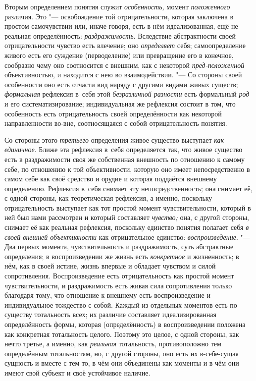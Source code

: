 Вторым определением понятия служит
{\em особенность,} момент
{\em положенного}
различия. Это "--- освобождение той
отрицательности, которая заключена в простом самочувствии или, иначе
говоря, есть в нём идеализованная, ещё не реальная определённость:
{\em раздражимость}.
Вследствие абстрактности своей отрицательности чувство есть
влечение; оно {\em определяет}
себя; самоопределение живого есть его суждение (перводеление)
или превращение его в конечное, сообразно чему оно соотносится с внешним,
как с некоторой {\em пред-положенной}
объективностью, и находится с нею во взаимодействии. "---
Со стороны своей особенности оно есть отчасти вид наряду с
другими видами живых существ;
{\em формальная}
рефлексия в~себя этой
{\em безразличной разности}
есть формальный {\em род}
и его систематизирование; индивидуальная же рефлексия состоит
в том, что особенность есть отрицательность своей определённости как
некоторой направленности во-вне, соотносящаяся с собой отрицательность
понятия.

Со стороны этого
{\em третьего}
определения живое существо выступает
{\em как единичное}.
Ближе эта рефлексия в~себя определяется так, что живое
существо есть в раздражимости своя же собственная внешность по отношению к
самому себе, по отношению к той объективности, которую оно имеет
непосредственно в самом себе как своё средство и орудие и которая поддаётся
внешнему определению. Рефлексия в~себя снимает эту непосредственность; она
снимает её, с одной стороны, как теоретическая рефлексия, а именно,
поскольку отрицательность выступает как тот простой момент
чувствительности, который в ней был нами рассмотрен и который составляет
{\em чувство;} она, с
другой стороны, снимает её как реальная рефлексия, поскольку единство
понятия полагает себя {\em в своей
внешней объективности} как отрицательное единство:
{\em воспроизведение}. "---
Два первых момента, чувствительность и раздражимость, суть
абстрактные определения; в воспроизведении же жизнь есть
{\em конкретное} и
жизненность; в нём, как в своей истине, жизнь впервые и обладает чувством и
силой сопротивления. Воспроизведение есть отрицательность как простой
момент чувствительности, и раздражимость есть живая сила сопротивления
только благодаря тому, что отношение к внешнему есть воспроизведение и
индивидуальное тождество с собой. Каждый из отдельных
моментов есть по существу тотальность всех; их различие составляет
идеализированная определённость формы, которая (определённость) в
воспроизведении положена как конкретная тотальность целого. Поэтому это
целое, с одной стороны, как нечто третье, а именно, как
{\em реальная}
тотальность, противоположно тем определённым тотальностям,
но, с другой стороны, оно есть их в-себе-сущая сущность и вместе с тем то,
в чём они объединены как моменты и в чём они имеют свой субъект и своё
устойчивое наличие.

